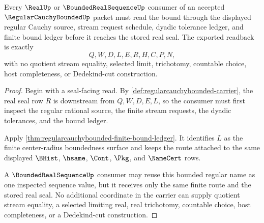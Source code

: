 \begin{theorem}
\label{thm:regularcauchybounded-real-window-readback}
Every $\RealUp$ or $\BoundedRealSequenceUp$ consumer of an accepted $\RegularCauchyBoundedUp$ packet must read the bound through the displayed regular Cauchy source, stream request schedule, dyadic tolerance ledger, and finite bound ledger before it reaches the stored real seal. The exported readback is exactly
$$
Q,W,D,L,E,R,H,C,P,N,
$$
with no quotient stream equality, selected limit, trichotomy, countable choice, host completeness, or Dedekind-cut construction.
\end{theorem}
\begin{proof}
Begin with a seal-facing read. By \autoref{def:regularcauchybounded-carrier}, the real seal row $R$ is downstream from $Q,W,D,E,L$, so the consumer must first inspect the regular rational source, the finite stream requests, the dyadic tolerances, and the bound ledger.

Apply \autoref{thm:regularcauchybounded-finite-bound-ledger}. It identifies $L$ as the finite center-radius boundedness surface and keeps the route attached to the same displayed $\BHist$, $\hsame$, $\Cont$, $\Pkg$, and $\NameCert$ rows.

A $\BoundedRealSequenceUp$ consumer may reuse this bounded regular name as one inspected sequence value, but it receives only the same finite route and the stored real seal. No additional coordinate in the carrier can supply quotient stream equality, a selected limiting real, real trichotomy, countable choice, host completeness, or a Dedekind-cut construction.
\end{proof}




